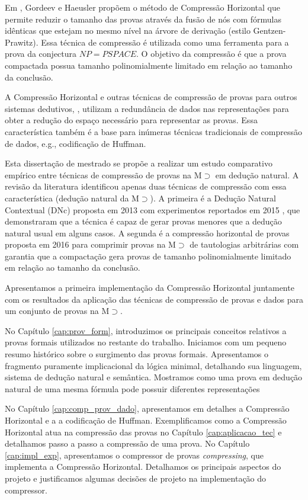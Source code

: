 Em \cite{GordeevH16}, Gordeev e Haeusler propõem o método de Compressão Horizontal que permite reduzir o tamanho das provas através da fusão de nós com fórmulas idênticas que estejam no mesmo nível na árvore de derivação (estilo Gentzen-Prawitz). Essa técnica de compressão é utilizada como uma ferramenta para a prova da conjectura $NP = PSPACE$. O objetivo da compressão é que a prova compactada possua tamanho polinomialmente limitado em relação ao tamanho da conclusão.

A Compressão Horizontal e outras técnicas de compressão de provas para outros sistemas dedutivos, \cite{vyskovcil2010automated, amjad2008data, boudou2014skeptik}, utilizam a redundância de dados nas representações para obter a redução do espaço necessário para representar as provas. Essa característica também é a base para inúmeras técnicas tradicionais de compressão de dados, e.g., codificação de Huffman.

Esta dissertação de mestrado se propõe a realizar um estudo comparativo empírico entre técnicas de compressão de provas na M$\supset$ em dedução natural. A revisão da literatura identificou apenas duas técnicas de compressão com essa característica (dedução natural da M$\supset$). A primeira é a Dedução Natural Contextual (DNc) proposta em 2013 \cite{NDcPaleo} com experimentos reportados em 2015 \cite{paleo2015implementation}, que demonstraram que a técnica é capaz de gerar provas menores que a dedução natural usual em alguns casos. A segunda é a compressão horizontal de provas proposta em 2016 \cite{GordeevH16} para comprimir provas na M$\supset$ de tautologias arbitrárias com garantia que a compactação gera provas de tamanho polinomialmente limitado em relação ao tamanho da conclusão.

Apresentamos a primeira implementação da Compressão Horizontal juntamente com os resultados da aplicação das técnicas de compressão de provas e dados para um conjunto de provas na M$\supset$.

No Capítulo \ref{cap:prov_form}, introduzimos os principais conceitos relativos a provas formais utilizados no restante do trabalho. Iniciamos com um pequeno resumo histórico sobre o surgimento das provas formais. Apresentamos o fragmento puramente implicacional da lógica minimal, detalhando sua linguagem, sistema de dedução natural e semântica. Mostramos como uma prova em dedução natural de uma mesma fórmula pode possuir diferentes representações

No Capítulo \ref{cap:comp_prov_dado}, apresentamos em detalhes a Compressão Horizontal e a a codificação de Huffman. Exemplificamos como a Compressão Horizontal atua na compressão das provas no Capítulo \ref{cap:aplicacao_tec} e detalhamos passo a passo a compressão de uma prova. No Capítulo \ref{cap:impl_exp}, apresentamos o compressor de provas \textit{compressing}, que implementa a Compressão Horizontal. Detalhamos os principais aspectos do projeto e justificamos algumas decisões de projeto na implementação do compressor.

